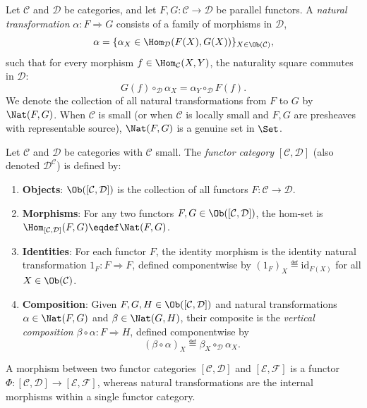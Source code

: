 
\begin{definition}
Let $\mathcal{C}$ and $\mathcal{D}$ be categories, and let $F, G : \mathcal{C} \to \mathcal{D}$ be parallel functors. A \emph{natural transformation} $\alpha : F \Rightarrow G$ consists of a family of morphisms in $\mathcal{D}$,
\[
\alpha = \{\alpha_X \in \Hom_{\mathcal{D}}(F(X), G(X))\}_{X \in \Ob(\mathcal{C})},
\]
such that for every morphism $f \in \Hom_{\mathcal{C}}(X, Y)$, the naturality square commutes in $\mathcal{D}$:
\[
G(f) \circ_{\mathcal{D}} \alpha_X = \alpha_Y \circ_{\mathcal{D}} F(f).
\]
We denote the collection of all natural transformations from $F$ to $G$ by $\Nat(F, G)$. When $\mathcal{C}$ is small (or when $\mathcal{C}$ is locally small and $F, G$ are presheaves with representable source), $\Nat(F, G)$ is a genuine set in $\Set$.
\end{definition}

\begin{definition}
Let $\mathcal{C}$ and $\mathcal{D}$ be categories with $\mathcal{C}$ small. The \emph{functor category} $[\mathcal{C}, \mathcal{D}]$ (also denoted $\mathcal{D}^{\mathcal{C}}$) is defined by:
\begin{enumerate}
    \item \textbf{Objects}: $\Ob([\mathcal{C}, \mathcal{D}])$ is the collection of all functors $F : \mathcal{C} \to \mathcal{D}$.
    \item \textbf{Morphisms}: For any two functors $F, G \in \Ob([\mathcal{C}, \mathcal{D}])$, the hom-set is $\Hom_{[\mathcal{C}, \mathcal{D}]}(F, G) \eqdef \Nat(F, G)$.
    \item \textbf{Identities}: For each functor $F$, the identity morphism is the identity natural transformation $1_F : F \Rightarrow F$, defined componentwise by $(1_F)_X \eqdef \mathrm{id}_{F(X)}$ for all $X \in \Ob(\mathcal{C})$.
    \item \textbf{Composition}: Given $F, G, H \in \Ob([\mathcal{C}, \mathcal{D}])$ and natural transformations $\alpha \in \Nat(F, G)$ and $\beta \in \Nat(G, H)$, their composite is the \emph{vertical composition} $\beta \circ \alpha : F \Rightarrow H$, defined componentwise by
    \[
    (\beta \circ \alpha)_X \eqdef \beta_X \circ_{\mathcal{D}} \alpha_X.
    \]
\end{enumerate}
A morphism between two functor categories $[\mathcal{C}, \mathcal{D}]$ and $[\mathcal{E}, \mathcal{F}]$ is a functor $\Phi : [\mathcal{C}, \mathcal{D}] \to [\mathcal{E}, \mathcal{F}]$, whereas natural transformations are the internal morphisms within a single functor category.
\end{definition}


